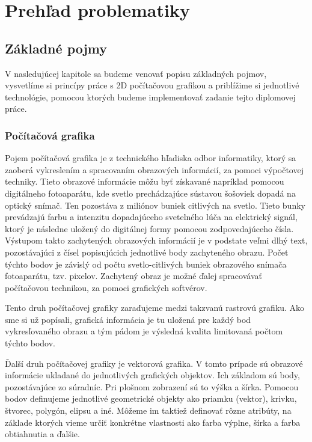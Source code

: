 \chapter{Prehľad problematiky}\label{chap:issues_overview}

\section{Základné pojmy}

V nasledujúcej kapitole sa budeme venovať popisu základných pojmov, vysvetlíme si princípy práce s 2D počítačovou grafikou a priblížime si jednotlivé technológie, pomocou ktorých budeme implementovať zadanie tejto diplomovej práce.

\subsection{Počítačová grafika}

Pojem počítačová grafika je z technického hľadiska odbor informatiky, ktorý sa zaoberá vykreslením a spracovaním obrazových informácií, za pomoci výpočtovej techniky. Tieto obrazové informácie môžu byť získavané napríklad pomocou digitálneho fotoaparátu, kde svetlo prechádzajúce sústavou šošoviek dopadá na optický snímač. Ten pozostáva z miliónov buniek citlivých na svetlo. Tieto bunky prevádzajú farbu a intenzitu dopadajúceho svetelného lúča na elektrický signál, ktorý je následne uložený do digitálnej formy pomocou zodpovedajúceho čísla. Výstupom takto zachytených obrazových informácií je v podstate veľmi dlhý text, pozostávajúci z čísel popisujúcich jednotlivé body zachyteného obrazu. Počet týchto bodov je závislý od počtu svetlo-citlivých buniek obrazového snímača fotoaparátu, tzv. pixelov. Zachytený obraz je možné ďalej spracovávať počítačovou technikou, za pomoci grafických softvérov. 

Tento druh počítačovej grafiky zaraďujeme medzi takzvanú rastrovú grafiku. Ako sme si už popísali, grafická informácia je tu uložená pre každý bod vykresľovaného obrazu a tým pádom je výsledná kvalita limitovaná počtom týchto bodov. 

Ďalší druh počítačovej grafiky je vektorová grafika. V tomto prípade sú obrazové informácie ukladané do jednotlivých grafických objektov. Ich základom sú body, pozostávajúce zo súradníc. Pri plošnom zobrazení sú to výška a šírka. Pomocou bodov definujeme jednotlivé geometrické objekty ako priamku (vektor), krivku, štvorec, polygón, elipsu a iné. Môžeme im taktiež definovať rôzne atribúty, na základe ktorých vieme určiť konkrétne vlastnosti ako farba výplne, šírka a farba obtiahnutia a ďalšie.

